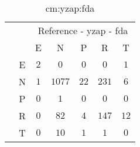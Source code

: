\begin{table}[!ht]
	\centering
	\begin{tabular}{|c|c|c|c|c|c|c|}
		\cline{3-7}
		\multicolumn{2}{c|}{} & \multicolumn{5}{|c|}{Reference - yzap - fda} \\ \cline{3-7}
		\multicolumn{2}{c|}{} & E & N & P & R & T \\ \hline
		\multirow{5}{*}{\rotatebox{90}{Prediction}} & E & $2$ & $0$ & $0$ & $0$ & $1$ \\ \cline{2-7}
		 & N & $1$ & $1077$ & $22$ & $231$ & $6$ \\ \cline{2-7}
		 & P & $0$ & $1$ & $0$ & $0$ & $0$ \\ \cline{2-7}
		 & R & $0$ & $82$ & $4$ & $147$ & $12$ \\ \cline{2-7}
		 & T & $0$ & $10$ & $1$ & $1$ & $0$ \\ \hline
	\end{tabular}
	\caption{cm:yzap:fda}
	\label{tab:cm:yzap:fda}
\end{table}
